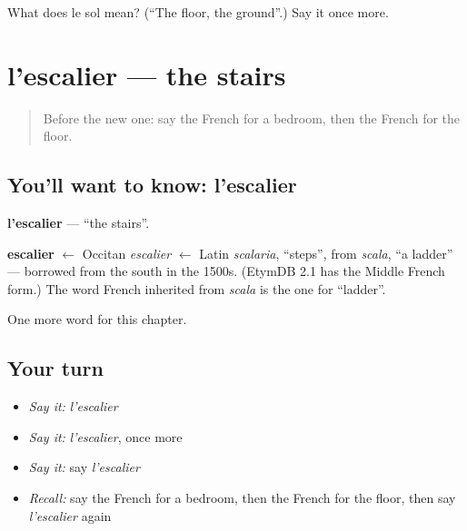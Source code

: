 \begin{tcolorbox}[breakable,colback=teal!4,colframe=teal!35!black,title={Before you move on}]
What does le sol mean? (\textquotedblleft{}The floor, the ground\textquotedblright{}.) Say it once more.
\end{tcolorbox}
\section[l'escalier]{l'escalier — the stairs}

\label{lesson:FR-C75-escalier}



\begin{quote}
Before the new one: say the French for a bedroom, then the French for the floor.
\end{quote}

\subsection*{You'll want to know: l'escalier}
\textbf{l'escalier} — \textquotedblleft{}the stairs\textquotedblright{}.

\begin{cousinweb}
\textbf{escalier} $\leftarrow$ Occitan \emph{escalier} $\leftarrow$ Latin \emph{scalaria}, \textquotedblleft{}steps\textquotedblright{}, from \emph{scala}, \textquotedblleft{}a ladder\textquotedblright{} — borrowed from the south in the 1500s. (EtymDB 2.1 has the Middle French form.) The word French inherited from \emph{scala} is the one for \textquotedblleft{}ladder\textquotedblright{}.
\end{cousinweb}

\begin{grammarlens}[title={What you've built}]
One more word for this chapter.
\end{grammarlens}

\subsection*{Your turn}
\begin{itemize}
\raggedright
  \item \emph{Say it:} \emph{l'escalier}
  \item \emph{Say it:} \emph{l'escalier}, once more
  \item \emph{Say it:} say \emph{l'escalier}
  \item \emph{Recall:} say the French for a bedroom, then the French for the floor, then say \emph{l'escalier} again
\end{itemize}


